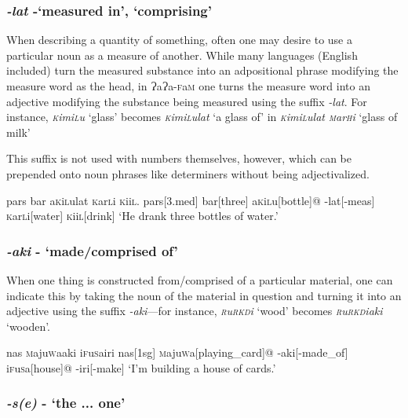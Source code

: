 \documentclass[a4paper,10pt,twoside,openright]{memoir}
\newcommand{\lang}{{\bigglot}a{\bigglot}a-\textsc{f}a\textsc{m}}
\newcommand{\bigglot}{Ɂ}
\newcommand{\famwordold}[5]{#1\textsc{#2}#3\textsc{#4}#5}
\begin{document}
\subsubsection{\emph{-lat} -`measured in', `comprising'}

When describing a quantity of something, often one may desire to use a particular noun as a measure of another. While many languages (English included) turn the measured substance into an adpositional phrase modifying the measure word as the head, in \lang{} one turns the measure word into an adjective modifying the substance being measured using the suffix \emph{-lat}. For instance, \emph{\famwordold{}{k}{imi}{l}{u}} `glass' becomes \emph{\famwordold{}{k}{imi}{l}{ulat}} `a glass of' in \emph{\famwordold{}{k}{imi}{l}{ulat} \famwordold{}{m}{ar}{h}{i}} `glass of milk'

This suffix is not used with numbers themselves, however, which can be prepended onto noun phrases like determiners without being adjectivalized.

\ex
\begingl
\glpreamble
pars bar \famwordold{a}{k}{i}{l}{ulat} \famwordold{}{k}{ar}{l}{i} \famwordold{}{k}{ii}{l}{}.
\endpreamble
pars[\sc 3.med]
bar[three]
\famwordold{a}{k}{i}{l}{u}[bottle]@
-lat[\sc -meas]
\famwordold{}{k}{ar}{l}{i}[water]
\famwordold{}{k}{ii}{l}{}[drink]
\glft `He drank three bottles of water.'
\endgl
\xe

\subsubsection{\emph{-aki} - `made/comprised of'}

When one thing is constructed from/comprised of a particular material, one can indicate this by taking the noun of the material in question and turning it into an adjective using the suffix \emph{-aki}---for instance, \textit{\famwordold{}{r}{u}{rkd}{i}} `wood' becomes \textit{\famwordold{}{r}{u}{rkd}{iaki}} `wooden'. 

\ex
\begingl
\glpreamble%
nas \famwordold{}{m}{aju}{w}{aaki} \famwordold{i}{f}{u}{s}{airi}%
\endpreamble%
nas[\sc 1sg]
\famwordold{}{m}{aju}{w}{a}[playing\_card]@
-aki[-made\_of]
\famwordold{i}{f}{u}{s}{a}[house]@
-iri[-make]
\glft `I'm building a house of cards.'
\endgl
\xe

\subsubsection{\emph{-s(e)} - `the ... one'}
\end{document}
